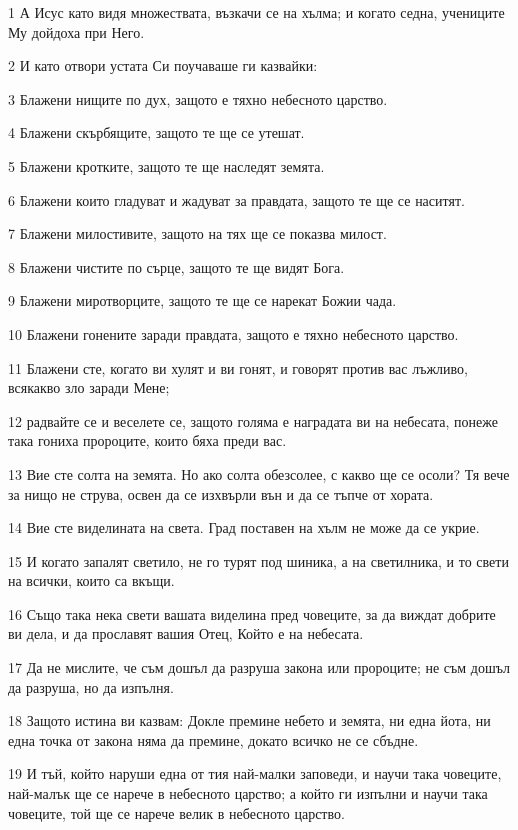 \par 1 А Исус като видя множествата, възкачи се на хълма; и когато седна, учениците Му дойдоха при Него.
\par 2 И като отвори устата Си поучаваше ги казвайки:
\par 3 Блажени нищите по дух, защото е тяхно небесното царство.
\par 4 Блажени скърбящите, защото те ще се утешат.
\par 5 Блажени кротките, защото те ще наследят земята.
\par 6 Блажени които гладуват и жадуват за правдата, защото те ще се наситят.
\par 7 Блажени милостивите, защото на тях ще се показва милост.
\par 8 Блажени чистите по сърце, защото те ще видят Бога.
\par 9 Блажени миротворците, защото те ще се нарекат Божии чада.
\par 10 Блажени гонените заради правдата, защото е тяхно небесното царство.
\par 11 Блажени сте, когато ви хулят и ви гонят, и говорят против вас лъжливо, всякакво зло заради Мене;
\par 12 радвайте се и веселете се, защото голяма е наградата ви на небесата, понеже така гониха пророците, които бяха преди вас.
\par 13 Вие сте солта на земята. Но ако солта обезсолее, с какво ще се осоли? Тя вече за нищо не струва, освен да се изхвърли вън и да се тъпче от хората.
\par 14 Вие сте виделината на света. Град поставен на хълм не може да се укрие.
\par 15 И когато запалят светило, не го турят под шиника, а на светилника, и то свети на всички, които са вкъщи.
\par 16 Също така нека свети вашата виделина пред човеците, за да виждат добрите ви дела, и да прославят вашия Отец, Който е на небесата.
\par 17 Да не мислите, че съм дошъл да разруша закона или пророците; не съм дошъл да разруша, но да изпълня.
\par 18 Защото истина ви казвам: Докле премине небето и земята, ни една йота, ни една точка от закона няма да премине, докато всичко не се сбъдне.
\par 19 И тъй, който наруши една от тия най-малки заповеди, и научи така човеците, най-малък ще се нарече в небесното царство; а който ги изпълни и научи така човеците, той ще се нарече велик в небесното царство.
